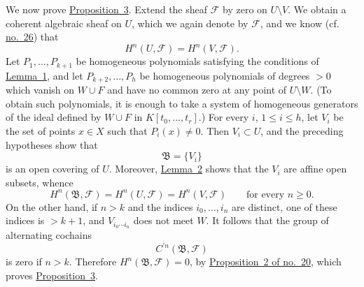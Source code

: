 We now prove \hyperref[fac:III:1:prop:3]{Proposition~3}. Extend the sheaf $\mathcal{F}$ by zero on
$U\setminus V$. We obtain a coherent algebraic sheaf on $U$, which we again
denote by $\mathcal{F}$, and we know (cf. \hyperref[fac:I:3:no:26]{no.~26}) that
\[
H^n(U,\mathcal{F})=H^n(V,\mathcal{F}).
\]
Let $P_1,\ldots,P_{k+1}$ be homogeneous polynomials satisfying the
conditions of \hyperref[fac:III:1:lemma:1]{Lemma~1}, and let $P_{k+2},\ldots,P_h$ be homogeneous
polynomials of degrees $>0$ which vanish on $W\cup F$ and have no common
zero at any point of $U\setminus W$. (To obtain such polynomials, it is
enough to take a system of homogeneous generators of the ideal defined by
$W\cup F$ in $K[t_0,\ldots,t_r]$.) For every $i$, $1\leq i\leq h$, let
$V_i$ be the set of points $x\in X$ such that $P_i(x)\neq0$. Then
$V_i\subset U$, and the preceding hypotheses show that
\label{fac:III:1:no:52:cover:B}
\[
\mathfrak{B}=\{V_i\}
\]
is an open covering of $U$. Moreover, \hyperref[fac:III:1:lemma:2]{Lemma~2} shows that the $V_i$ are
affine open subsets, whence
\[
H^n(\mathfrak{B},\mathcal{F})
 =H^n(U,\mathcal{F})
 =H^n(V,\mathcal{F})
\qquad\text{for every }n\geq0.
\]
On the other hand, if $n>k$ and the indices $i_0,\ldots,i_n$ are distinct,
one of these indices is $>k+1$, and $V_{i_0\cdots i_n}$ does not meet $W$.
It follows that the group of alternating cochains
\label{fac:III:1:no:52:formula:alternating-cochains}
\[
C^{\prime n}(\mathfrak{B},\mathcal{F})
\]
is zero if $n>k$. Therefore
$H^n(\mathfrak{B},\mathcal{F})=0$, by \hyperref[fac:I:3:no:20:prop:2]{Proposition~2 of no.~20}, which proves
\hyperref[fac:III:1:prop:3]{Proposition~3}.
